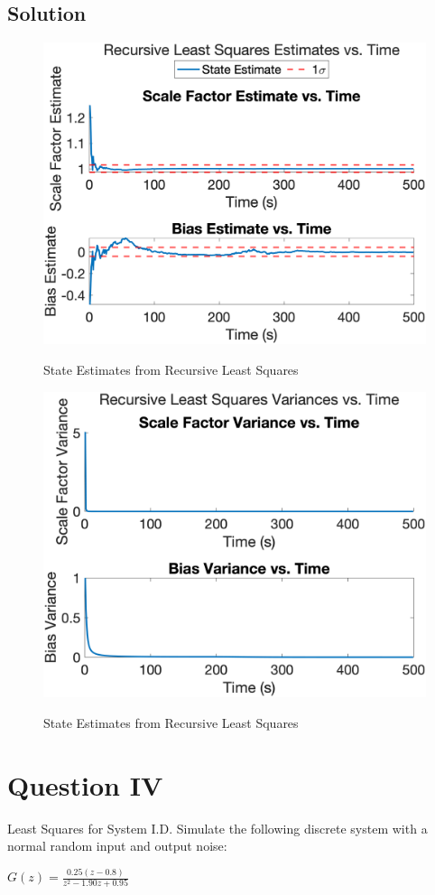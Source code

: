 \documentclass{article}
\begin{document}
\subsection*{Solution}
\begin{figure}[H]
    \centering
    \includegraphics[width=0.75\linewidth]{../figures/p3d_state.png}\label{fig:p3d_state}
    \caption{State Estimates from Recursive Least Squares}
\end{figure}
\begin{figure}[H]
    \centering
    \includegraphics[width=0.75\linewidth]{../figures/p3d_variance.png}\label{fig:p3d_variance}
    \caption{State Estimates from Recursive Least Squares}
\end{figure}

\section*{Question IV}
Least Squares for System I.D. Simulate the following discrete system with a normal random input and output noise:
\begin{center}
    $G(z) = \frac{0.25(z - 0.8)}{z^2 - 1.90z + 0.95}$
\end{center}
\end{document}
